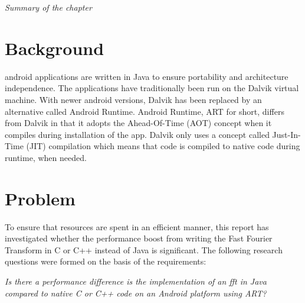 \textit{Summary of the chapter}


\section{Background}
\gls{android} applications are written in Java to ensure portability and architecture independence. The applications have traditionally been run on the Dalvik virtual machine. With newer android versions, Dalvik has been replaced by an alternative called Android Runtime. Android Runtime, ART for short, differs from Dalvik in that it adopts the Ahead-Of-Time (AOT) concept when it compiles during installation of the app. Dalvik only uses a concept called Just-In-Time (JIT) compilation which means that code is compiled to native code during runtime, when needed.

\section{Problem}
To ensure that resources are spent in an efficient manner, this report has investigated whether the performance boost from writing the Fast Fourier Transform in C or C++ instead of Java is significant. The following research questions were formed on the basis of the requirements:



\begin{center}
    \textit{Is there a performance difference is the implementation of an \gls{fft} in Java compared to native C or C++ code on an Android platform using ART?}
\end{center}


